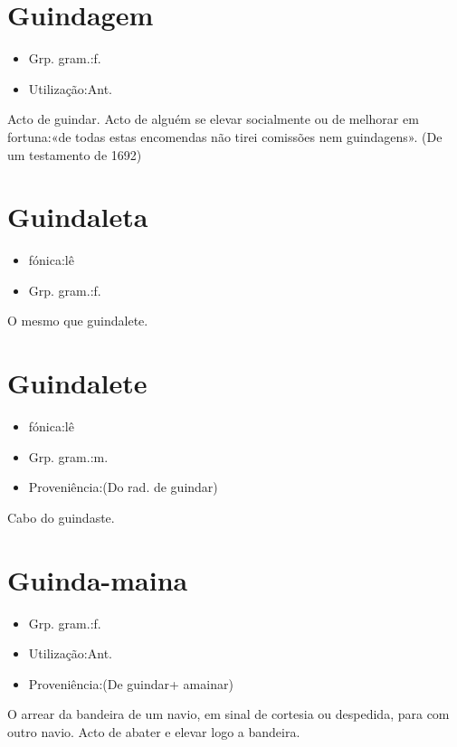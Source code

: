 \section{Guindagem}
\begin{itemize}
\item {Grp. gram.:f.}
\end{itemize}
\begin{itemize}
\item {Utilização:Ant.}
\end{itemize}
Acto de guindar.
Acto de alguém se elevar socialmente ou de melhorar em fortuna:«\textunderscore de todas estas encomendas não tirei comissões nem guindagens\textunderscore ». (De um testamento de 1692)
\section{Guindaleta}
\begin{itemize}
\item {fónica:lê}
\end{itemize}
\begin{itemize}
\item {Grp. gram.:f.}
\end{itemize}
O mesmo que \textunderscore guindalete\textunderscore .
\section{Guindalete}
\begin{itemize}
\item {fónica:lê}
\end{itemize}
\begin{itemize}
\item {Grp. gram.:m.}
\end{itemize}
\begin{itemize}
\item {Proveniência:(Do rad. de \textunderscore guindar\textunderscore )}
\end{itemize}
Cabo do guindaste.
\section{Guinda-maina}
\begin{itemize}
\item {Grp. gram.:f.}
\end{itemize}
\begin{itemize}
\item {Utilização:Ant.}
\end{itemize}
\begin{itemize}
\item {Proveniência:(De \textunderscore guindar\textunderscore  + \textunderscore amainar\textunderscore )}
\end{itemize}
O arrear da bandeira de um navio, em sinal de cortesia ou despedida, para com outro navio.
Acto de abater e elevar logo a bandeira.
